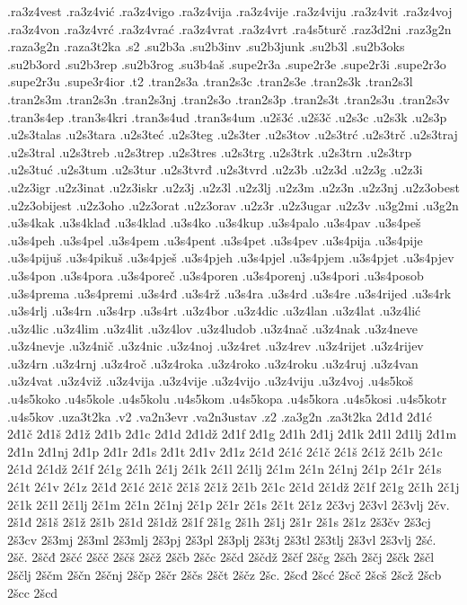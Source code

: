 {.ra3z4vest
.ra3z4vić
.ra3z4vigo
.ra3z4vija
.ra3z4vije
.ra3z4viju
.ra3z4vit
.ra3z4voj
.ra3z4von
.ra3z4vrć
.ra3z4vrać
.ra3z4vrat
.ra3z4vrt
.ra4s5turč
.raz3d2ni
.raz3g2n
.raza3g2n
.raza3t2ka
.s2
.su2b3a
.su2b3inv
.su2b3junk
.su2b3l
.su2b3oks
.su2b3ord
.su2b3rep
.su2b3rog
.su3b4aš
.supe2r3a
.supe2r3e
.supe2r3i
.supe2r3o
.supe2r3u
.supe3r4ior
.t2
.tran2s3a
.tran2s3c
.tran2s3e
.tran2s3k
.tran2s3l
.tran2s3m
.tran2s3n
.tran2s3nj
.tran2s3o
.tran2s3p
.tran2s3t
.tran2s3u
.tran2s3v
.tran3s4ep
.tran3s4kri
.tran3s4ud
.tran3s4um
.u2š3ć
.u2š3č
.u2s3c
.u2s3k
.u2s3p
.u2s3talas
.u2s3tara
.u2s3teć
.u2s3teg
.u2s3ter
.u2s3tov
.u2s3trć
.u2s3trč
.u2s3traj
.u2s3tral
.u2s3treb
.u2s3trep
.u2s3tres
.u2s3trg
.u2s3trk
.u2s3trn
.u2s3trp
.u2s3tuć
.u2s3tum
.u2s3tur
.u2s3tvrđ
.u2s3tvrd
.u2z3b
.u2z3d
.u2z3g
.u2z3i
.u2z3igr
.u2z3inat
.u2z3iskr
.u2z3j
.u2z3l
.u2z3lj
.u2z3m
.u2z3n
.u2z3nj
.u2z3obest
.u2z3obijest
.u2z3oho
.u2z3orat
.u2z3orav
.u2z3r
.u2z3ugar
.u2z3v
.u3g2mi
.u3g2n
.u3s4kak
.u3s4klađ
.u3s4klad
.u3s4ko
.u3s4kup
.u3s4palo
.u3s4pav
.u3s4peš
.u3s4peh
.u3s4pel
.u3s4pem
.u3s4pent
.u3s4pet
.u3s4pev
.u3s4pija
.u3s4pije
.u3s4pijuš
.u3s4pikuš
.u3s4pješ
.u3s4pjeh
.u3s4pjel
.u3s4pjem
.u3s4pjet
.u3s4pjev
.u3s4pon
.u3s4pora
.u3s4poreč
.u3s4poren
.u3s4porenj
.u3s4pori
.u3s4posob
.u3s4prema
.u3s4premi
.u3s4rđ
.u3s4rž
.u3s4ra
.u3s4rd
.u3s4re
.u3s4rijed
.u3s4rk
.u3s4rlj
.u3s4rn
.u3s4rp
.u3s4rt
.u3z4bor
.u3z4dic
.u3z4lan
.u3z4lat
.u3z4lić
.u3z4lic
.u3z4lim
.u3z4lit
.u3z4lov
.u3z4ludob
.u3z4nač
.u3z4nak
.u3z4neve
.u3z4nevje
.u3z4nič
.u3z4nic
.u3z4noj
.u3z4ret
.u3z4rev
.u3z4rijet
.u3z4rijev
.u3z4rn
.u3z4rnj
.u3z4roč
.u3z4roka
.u3z4roko
.u3z4roku
.u3z4ruj
.u3z4van
.u3z4vat
.u3z4viž
.u3z4vija
.u3z4vije
.u3z4vijo
.u3z4viju
.u3z4voj
.u4s5koš
.u4s5koko
.u4s5kole
.u4s5kolu
.u4s5kom
.u4s5kopa
.u4s5kora
.u4s5kosi
.u4s5kotr
.u4s5kov
.uza3t2ka
.v2
.va2n3evr
.va2n3ustav
.z2
.za3g2n
.za3t2ka
2đ1đ
2đ1ć
2đ1č
2đ1š
2đ1ž
2đ1b
2đ1c
2đ1d
2đ1dž
2đ1f
2đ1g
2đ1h
2đ1j
2đ1k
2đ1l
2đ1lj
2đ1m
2đ1n
2đ1nj
2đ1p
2đ1r
2đ1s
2đ1t
2đ1v
2đ1z
2ć1đ
2ć1ć
2ć1č
2ć1š
2ć1ž
2ć1b
2ć1c
2ć1d
2ć1dž
2ć1f
2ć1g
2ć1h
2ć1j
2ć1k
2ć1l
2ć1lj
2ć1m
2ć1n
2ć1nj
2ć1p
2ć1r
2ć1s
2ć1t
2ć1v
2ć1z
2č1đ
2č1ć
2č1č
2č1š
2č1ž
2č1b
2č1c
2č1d
2č1dž
2č1f
2č1g
2č1h
2č1j
2č1k
2č1l
2č1lj
2č1m
2č1n
2č1nj
2č1p
2č1r
2č1s
2č1t
2č1z
2č3vj
2č3vl
2č3vlj
2čv.
2š1đ
2š1š
2š1ž
2š1b
2š1d
2š1dž
2š1f
2š1g
2š1h
2š1j
2š1r
2š1s
2š1z
2š3čv
2š3cj
2š3cv
2š3mj
2š3ml
2š3mlj
2š3pj
2š3pl
2š3plj
2š3tj
2š3tl
2š3tlj
2š3vl
2š3vlj
2šć.
2šč.
2ščđ
2ščć
2ščč
2ščš
2ščž
2ščb
2ščc
2ščd
2ščdž
2ščf
2ščg
2ščh
2ščj
2ščk
2ščl
2ščlj
2ščm
2ščn
2ščnj
2ščp
2ščr
2ščs
2ščt
2ščz
2šc.
2šcđ
2šcć
2šcč
2šcš
2šcž
2šcb
2šcc
2šcd
}
